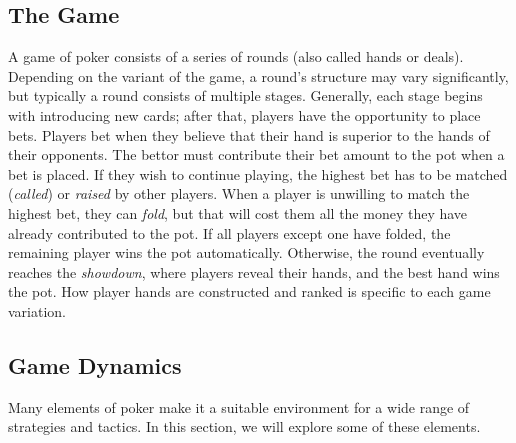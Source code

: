 \subsection{The Game}
\label{sec:poker-game}
A game of poker consists of a series of rounds (also called hands or deals). Depending on the variant of the game, a round's structure may vary significantly, but typically a round consists of multiple stages. Generally, each stage begins with introducing new cards; after that, players have the opportunity to place bets. Players bet when they believe that their hand is superior to the hands of their opponents. The bettor must contribute their bet amount to the pot when a bet is placed. If they wish to continue playing, the highest bet has to be matched (\textit{called}) or \textit{raised} by other players. When a player is unwilling to match the highest bet, they can \textit{fold}, but that will cost them all the money they have already contributed to the pot. If all players except one have folded, the remaining player wins the pot automatically. Otherwise, the round eventually reaches the \textit{showdown}, where players reveal their hands, and the best hand wins the pot. How player hands are constructed and ranked is specific to each game variation.

\subsection{Game Dynamics}
Many elements of poker make it a suitable environment for a wide range of strategies and tactics. In this section, we will explore some of these elements.

